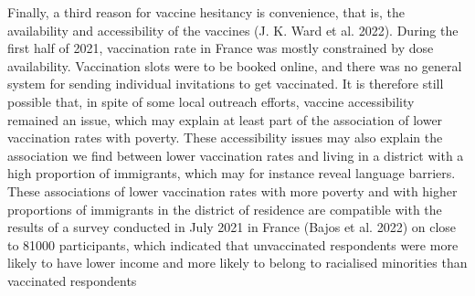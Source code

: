 \documentclass[
]{article}
\begin{document}
Finally, a third reason for vaccine hesitancy is convenience, that is, the availability and accessibility of the vaccines (J. K. Ward et al. 2022). During the first half of 2021, vaccination rate in France was mostly constrained by dose availability. Vaccination slots were to be booked online, and there was no general system for sending individual invitations to get vaccinated. It is therefore still possible that, in spite of some local outreach efforts, vaccine accessibility remained an issue, which may explain at least part of the association of lower vaccination rates with poverty. These accessibility issues may also explain the association we find between lower vaccination rates and living in a district with a high proportion of immigrants, which may for instance reveal language barriers. These associations of lower vaccination rates with more poverty and with higher proportions of immigrants in the district of residence are compatible with the results of a survey conducted in July 2021 in France (Bajos et al. 2022) on close to 81000 participants, which indicated that unvaccinated respondents were more likely to have lower income and more likely to belong to racialised minorities than vaccinated respondents
\end{document}
